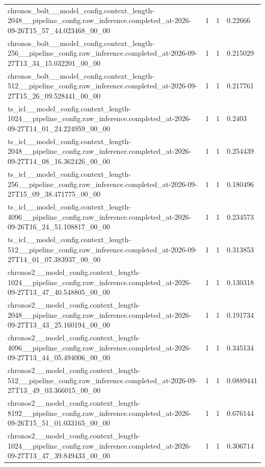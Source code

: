 \begin{tabular}{llll}
chronos\_bolt\_\_model\_config.context\_length-2048\_\_pipeline\_config.raw\_inference.completed\_at-2026-09-26T15\_57\_44.023468\_00\_00 & 1 & 1 & 0.22666 \\
chronos\_bolt\_\_model\_config.context\_length-256\_\_pipeline\_config.raw\_inference.completed\_at-2026-09-27T13\_34\_15.032201\_00\_00 & 1 & 1 & 0.215029 \\
chronos\_bolt\_\_model\_config.context\_length-512\_\_pipeline\_config.raw\_inference.completed\_at-2026-09-27T15\_26\_09.528441\_00\_00 & 1 & 1 & 0.217761 \\
ts\_icl\_\_model\_config.context\_length-1024\_\_pipeline\_config.raw\_inference.completed\_at-2026-09-27T14\_01\_24.224959\_00\_00 & 1 & 1 & 0.2403 \\
ts\_icl\_\_model\_config.context\_length-2048\_\_pipeline\_config.raw\_inference.completed\_at-2026-09-27T14\_08\_16.362426\_00\_00 & 1 & 1 & 0.254439 \\
ts\_icl\_\_model\_config.context\_length-256\_\_pipeline\_config.raw\_inference.completed\_at-2026-09-27T15\_09\_38.471775\_00\_00 & 1 & 1 & 0.180496 \\
ts\_icl\_\_model\_config.context\_length-4096\_\_pipeline\_config.raw\_inference.completed\_at-2026-09-26T16\_24\_51.108817\_00\_00 & 1 & 1 & 0.234573 \\
ts\_icl\_\_model\_config.context\_length-512\_\_pipeline\_config.raw\_inference.completed\_at-2026-09-27T14\_01\_07.383937\_00\_00 & 1 & 1 & 0.313853 \\
chronos2\_\_model\_config.context\_length-1024\_\_pipeline\_config.raw\_inference.completed\_at-2026-09-27T13\_47\_40.548805\_00\_00 & 1 & 1 & 0.130318 \\
chronos2\_\_model\_config.context\_length-2048\_\_pipeline\_config.raw\_inference.completed\_at-2026-09-27T13\_43\_25.160194\_00\_00 & 1 & 1 & 0.191734 \\
chronos2\_\_model\_config.context\_length-4096\_\_pipeline\_config.raw\_inference.completed\_at-2026-09-27T13\_44\_05.494006\_00\_00 & 1 & 1 & 0.345134 \\
chronos2\_\_model\_config.context\_length-512\_\_pipeline\_config.raw\_inference.completed\_at-2026-09-27T13\_49\_03.366015\_00\_00 & 1 & 1 & 0.0889441 \\
chronos2\_\_model\_config.context\_length-8192\_\_pipeline\_config.raw\_inference.completed\_at-2026-09-26T15\_51\_01.033165\_00\_00 & 1 & 1 & 0.676144 \\
chronos2\_\_model\_config.context\_length-1024\_\_pipeline\_config.raw\_inference.completed\_at-2026-09-27T13\_47\_39.849433\_00\_00 & 1 & 1 & 0.306714 \\

\end{tabular}
